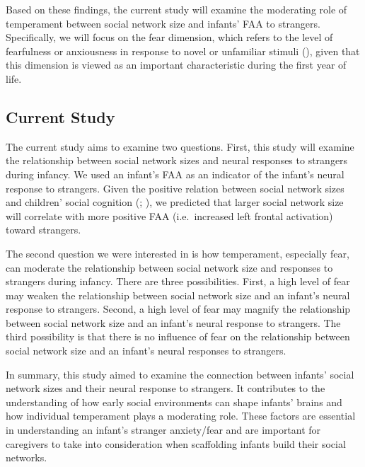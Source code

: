 \documentclass[
  man,
  floatsintext,
  longtable,
  nolmodern,
  notxfonts,
  notimes,
  colorlinks=true,linkcolor=blue,citecolor=blue,urlcolor=blue]{apa7}
\begin{document}
Based on these findings, the current study will examine the moderating
role of temperament between social network size and infants' FAA to
strangers. Specifically, we will focus on the fear dimension, which
refers to the level of fearfulness or anxiousness in response to novel
or unfamiliar stimuli
(), given that this dimension is viewed as an important
characteristic during the first year of life.

\subsection{Current Study}\label{sec-current-study}

The current study aims to examine two questions. First, this study will
examine the relationship between social network sizes and neural
responses to strangers during infancy. We used an infant's FAA as an
indicator of the infant's neural response to strangers. Given the
positive relation between social network sizes and children' social
cognition (; ), we predicted that larger social network size will correlate with
more positive FAA (i.e.~increased left frontal activation) toward
strangers.

The second question we were interested in is how temperament, especially
fear, can moderate the relationship between social network size and
responses to strangers during infancy. There are three possibilities.
First, a high level of fear may weaken the relationship between social
network size and an infant's neural response to strangers. Second, a
high level of fear may magnify the relationship between social network
size and an infant's neural response to strangers. The third possibility
is that there is no influence of fear on the relationship between social
network size and an infant's neural responses to strangers.

In summary, this study aimed to examine the connection between infants'
social network sizes and their neural response to strangers. It
contributes to the understanding of how early social environments can
shape infants' brains and how individual temperament plays a moderating
role. These factors are essential in understanding an infant's stranger
anxiety/fear and are important for caregivers to take into consideration
when scaffolding infants build their social networks.
\end{document}
